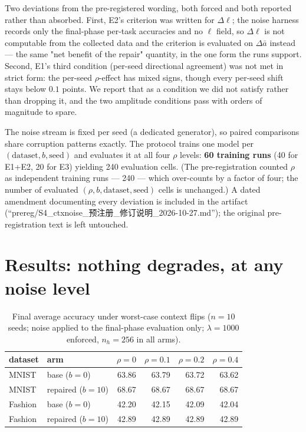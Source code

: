 \documentclass[review,12pt,number]{elsarticle}
\begin{document}
Two deviations from the pre-registered wording, both forced and both
reported rather than absorbed. First, E2's criterion was written for
$\Delta\ell$; the noise harness records only the final-phase
per-task accuracies and no $\ell$ field, so $\Delta\ell$ is not
computable from the collected data and the criterion is evaluated on
$\Delta\bar a$ instead --- the same "net benefit of the repair"
quantity, in the one form the runs support. Second, E1's third
condition (per-seed directional agreement) was not met in strict
form: the per-seed $\rho$-effect has mixed signs, though every
per-seed shift stays below $0.1$ points. We report that as a
condition we did not satisfy rather than dropping it, and the two
amplitude conditions pass with orders of magnitude to spare.

The noise stream is fixed per seed (a dedicated generator), so paired
comparisons share corruption patterns exactly. The protocol trains one
model per $(\text{dataset}, b, \text{seed})$ and evaluates it at all
four $\rho$ levels: \textbf{60 training runs} (40 for E1+E2, 20 for E3)
yielding 240 evaluation cells. (The pre-registration counted $\rho$ as
independent training runs --- 240 --- which over-counts by a factor of
four; the number of evaluated $(\rho, b, \text{dataset}, \text{seed})$
cells is unchanged.) A dated amendment documenting every deviation is
included in the artifact
(``prereg/S4\_ctxnoise\_预注册\_修订说明\_2026-10-27.md''); the original
pre-registration text is left untouched.

\section{Results: nothing degrades, at any noise level}
\label{sec:results}

\begin{table}[t]
\centering
\caption{Final average accuracy under worst-case context flips
($n{=}10$ seeds; noise applied to the final-phase evaluation only;
$\lambda{=}1000$ enforced, $n_h{=}256$ in all arms).}
\label{tab:main}
\begin{tabular}{llrrrr}
\toprule
dataset & arm & $\rho{=}0$ & $\rho{=}0.1$ & $\rho{=}0.2$ & $\rho{=}0.4$ \\
\midrule
MNIST    & base ($b{=}0$)    & 63.86 & 63.79 & 63.72 & 63.62 \\
MNIST    & repaired ($b{=}10$) & 68.67 & 68.67 & 68.67 & 68.67 \\
Fashion  & base ($b{=}0$)    & 42.20 & 42.15 & 42.09 & 42.04 \\
Fashion  & repaired ($b{=}10$) & 42.89 & 42.89 & 42.89 & 42.89 \\
\bottomrule
\end{tabular}
\end{table}
\end{document}
